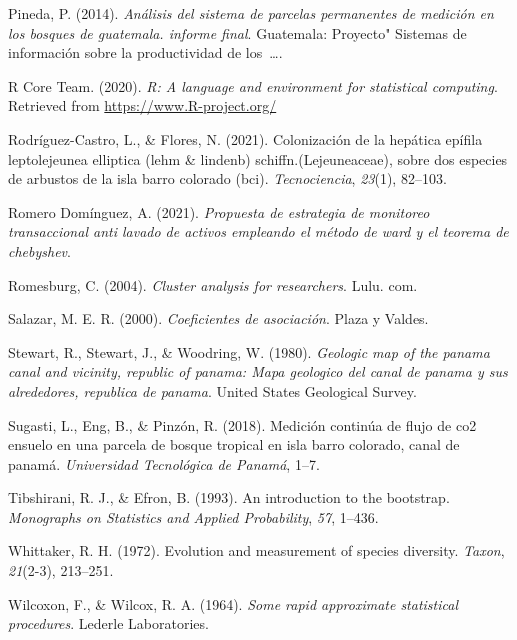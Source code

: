 \documentclass[11pt,]{article}
\begin{document}
\hypertarget{ref-pineda2014analisis}{}
Pineda, P. (2014). \emph{Análisis del sistema de parcelas permanentes de
medición en los bosques de guatemala. informe final}. Guatemala:
Proyecto" Sistemas de información sobre la productividad de
los~\ldots{}.

\hypertarget{ref-R2020ALanguage}{}
R Core Team. (2020). \emph{R: A language and environment for statistical
computing}. Retrieved from \url{https://www.R-project.org/}

\hypertarget{ref-rodriguez2021colonizacion}{}
Rodríguez-Castro, L., \& Flores, N. (2021). Colonización de la hepática
epífila leptolejeunea elliptica (lehm \& lindenb)
schiffn.(Lejeuneaceae), sobre dos especies de arbustos de la isla barro
colorado (bci). \emph{Tecnociencia}, \emph{23}(1), 82--103.

\hypertarget{ref-romero2021propuesta}{}
Romero Domínguez, A. (2021). \emph{Propuesta de estrategia de monitoreo
transaccional anti lavado de activos empleando el método de ward y el
teorema de chebyshev}.

\hypertarget{ref-romesburg2004cluster}{}
Romesburg, C. (2004). \emph{Cluster analysis for researchers}. Lulu.
com.

\hypertarget{ref-salazar2000coeficientes}{}
Salazar, M. E. R. (2000). \emph{Coeficientes de asociación}. Plaza y
Valdes.

\hypertarget{ref-stewart1980geologic}{}
Stewart, R., Stewart, J., \& Woodring, W. (1980). \emph{Geologic map of
the panama canal and vicinity, republic of panama: Mapa geologico del
canal de panama y sus alrededores, republica de panama}. United States
Geological Survey.

\hypertarget{ref-sugasti2018medicion}{}
Sugasti, L., Eng, B., \& Pinzón, R. (2018). Medición continúa de flujo
de co2 ensuelo en una parcela de bosque tropical en isla barro colorado,
canal de panamá. \emph{Universidad Tecnológica de Panamá}, 1--7.

\hypertarget{ref-tibshirani1993introduction}{}
Tibshirani, R. J., \& Efron, B. (1993). An introduction to the
bootstrap. \emph{Monographs on Statistics and Applied Probability},
\emph{57}, 1--436.

\hypertarget{ref-whittaker1972evolution}{}
Whittaker, R. H. (1972). Evolution and measurement of species diversity.
\emph{Taxon}, \emph{21}(2-3), 213--251.

\hypertarget{ref-wilcoxon1964some}{}
Wilcoxon, F., \& Wilcox, R. A. (1964). \emph{Some rapid approximate
statistical procedures}. Lederle Laboratories.




\newpage
\singlespacing 
\end{document}
